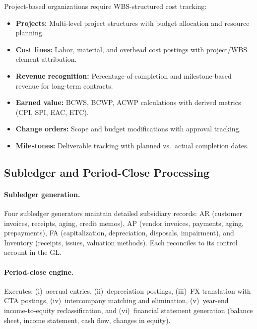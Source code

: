 Project-based organizations require WBS-structured cost tracking:

\begin{itemize}
  \item \textbf{Projects:} Multi-level project structures with budget
    allocation and resource planning.
  \item \textbf{Cost lines:} Labor, material, and overhead cost
    postings with project/WBS element attribution.
  \item \textbf{Revenue recognition:} Percentage-of-completion and
    milestone-based revenue for long-term contracts.
  \item \textbf{Earned value:} BCWS, BCWP, ACWP calculations with
    derived metrics (CPI, SPI, EAC, ETC).
  \item \textbf{Change orders:} Scope and budget modifications with
    approval tracking.
  \item \textbf{Milestones:} Deliverable tracking with planned vs.\
    actual completion dates.
\end{itemize}

\subsection{Subledger and Period-Close Processing}
\label{sec:gen_subledger}

\paragraph{Subledger generation.}
Four subledger generators maintain detailed subsidiary records:
AR (customer invoices, receipts, aging, credit memos),
AP (vendor invoices, payments, aging, prepayments),
FA (capitalization, depreciation, disposals, impairment),
and Inventory (receipts, issues, valuation methods).
Each reconciles to its control account in the GL.

\paragraph{Period-close engine.}
Executes: (i)~accrual entries, (ii)~depreciation postings,
(iii)~FX translation with CTA postings, (iv)~intercompany
matching and elimination, (v)~year-end income-to-equity
reclassification, and (vi)~financial statement generation
(balance sheet, income statement, cash flow, changes in equity).

